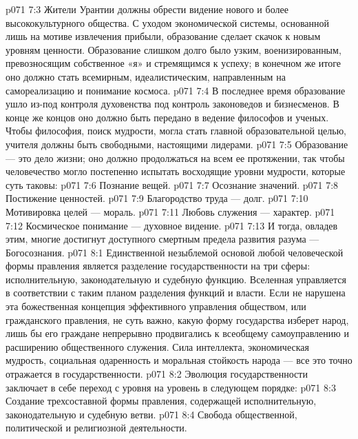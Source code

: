 \vs p071 7:3 Жители Урантии должны обрести видение нового и более высококультурного общества. С уходом экономической системы, основанной лишь на мотиве извлечения прибыли, образование сделает скачок к новым уровням ценности. Образование слишком долго было узким, военизированным, превозносящим собственное «я» и стремящимся к успеху; в конечном же итоге оно должно стать всемирным, идеалистическим, направленным на самореализацию и понимание космоса.
\vs p071 7:4 В последнее время образование ушло из\hyp{}под контроля духовенства под контроль законоведов и бизнесменов. В конце же концов оно должно быть передано в ведение философов и ученых. Чтобы философия, поиск мудрости, могла стать главной образовательной целью, учителя должны быть свободными, настоящими лидерами.
\vs p071 7:5 Образование --- это дело жизни; оно должно продолжаться на всем ее протяжении, так чтобы человечество могло постепенно испытать восходящие уровни мудрости, которые суть таковы:
\vs p071 7:6 \bibnobreakspace Познание вещей.
\vs p071 7:7 \bibnobreakspace Осознание значений.
\vs p071 7:8 \bibnobreakspace Постижение ценностей.
\vs p071 7:9 \bibnobreakspace Благородство труда --- долг.
\vs p071 7:10 \bibnobreakspace Мотивировка целей --- мораль.
\vs p071 7:11 \bibnobreakspace Любовь служения --- характер.
\vs p071 7:12 \bibnobreakspace Космическое понимание --- духовное видение.
\vs p071 7:13 \pc И тогда, овладев этим, многие достигнут доступного смертным предела развития разума --- Богосознания.
\vs p071 8:1 Единственной незыблемой основой любой человеческой формы правления является разделение государственности на три сферы: исполнительную, законодательную и судебную функцию. Вселенная управляется в соответствии с таким планом разделения функций и власти. Если не нарушена эта божественная концепция эффективного управления обществом, или гражданского правления, не суть важно, какую форму государства изберет народ, лишь бы его граждане непрерывно продвигались к всеобщему самоуправлению и расширению общественного служения. Сила интеллекта, экономическая мудрость, социальная одаренность и моральная стойкость народа --- все это точно отражается в государственности.
\vs p071 8:2 Эволюция государственности заключает в себе переход с уровня на уровень в следующем порядке:
\vs p071 8:3 \bibnobreakspace Создание трехсоставной формы правления, содержащей исполнительную, законодательную и судебную ветви.
\vs p071 8:4 \bibnobreakspace Свобода общественной, политической и религиозной деятельности.
